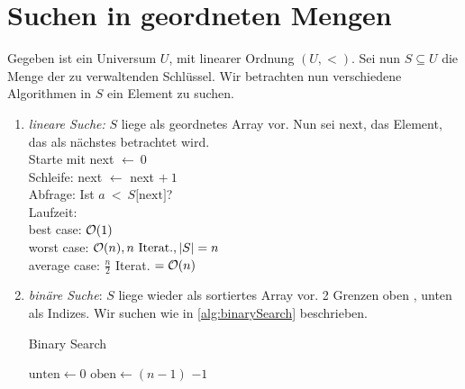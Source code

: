 \chapter{Suchen in geordneten Mengen}
    Gegeben ist ein Universum $U$, mit linearer Ordnung $(U, <)$. Sei nun $S \subseteq U$ die Menge der zu verwaltenden Schlüssel. Wir betrachten nun verschiedene Algorithmen in $S$ ein Element zu suchen.
    \begin{enumerate}[1.] 
        \item \emph{lineare Suche:} $S$ liege als geordnetes Array vor. Nun sei next, das Element, das als nächstes betrachtet wird. \\
        Starte mit next $\leftarrow~0$\\
        Schleife: next $\leftarrow$ next $+~1$\\
        Abfrage: Ist $a~<~S\lbrack\text{next}\rbrack$?\\
        Laufzeit:\\
        best case: $\mathcal{O}(1)$\\
        worst case: $\mathcal{O}(n), n \text{ Iterat.}, |S| = n$\\
        average case: $\frac{n}{2}$ Iterat. $= \mathcal{O}(n)$
        \item \emph{binäre Suche}: $S$ liege wieder als sortiertes Array vor. 2 Grenzen oben , unten als Indizes. Wir suchen wie in \autoref{alg:binarySearch} beschrieben.\\
            \begin{algorithm}
        		\caption{Binary Search}
        		\label{alg:binarySearch}
        		\begin{algorithmic}[1]
        			    \State $\text{unten} \gets 0$
        			    \State $\text{oben} \gets (n-1)$ 
                            \Else 
                            \EndIf    
        				\EndWhile
        				\State \Return $-1$
        			\EndFunction
        		\end{algorithmic}
        	\end{algorithm}

\end{enumerate}
